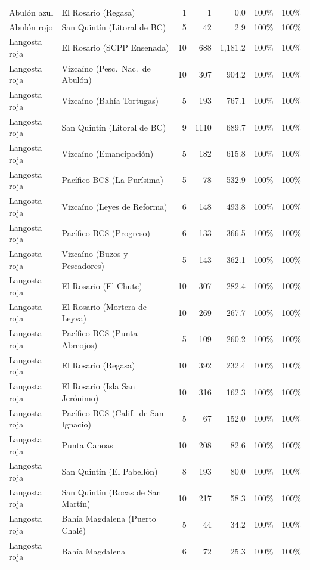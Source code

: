 \begin{longtable}{llrrrrc}
Abulón azul & El Rosario (Regasa) & 1 & 1 & 0.0 & 100\% & 100\% \\
Abulón rojo & San Quintín (Litoral de BC) & 5 & 42 & 2.9 & 100\% & 100\% \\
Langosta roja & El Rosario (SCPP Ensenada) & 10 & 688 & 1,181.2 & 100\% & 100\% \\
Langosta roja & Vizcaíno (Pesc.\ Nac.\ de Abulón) & 10 & 307 & 904.2 & 100\% & 100\% \\
Langosta roja & Vizcaíno (Bahía Tortugas) & 5 & 193 & 767.1 & 100\% & 100\% \\
Langosta roja & San Quintín (Litoral de BC) & 9 & 1110 & 689.7 & 100\% & 100\% \\
Langosta roja & Vizcaíno (Emancipación) & 5 & 182 & 615.8 & 100\% & 100\% \\
Langosta roja & Pacífico BCS (La Purísima) & 5 & 78 & 532.9 & 100\% & 100\% \\
Langosta roja & Vizcaíno (Leyes de Reforma) & 6 & 148 & 493.8 & 100\% & 100\% \\
Langosta roja & Pacífico BCS (Progreso) & 6 & 133 & 366.5 & 100\% & 100\% \\
Langosta roja & Vizcaíno (Buzos y Pescadores) & 5 & 143 & 362.1 & 100\% & 100\% \\
Langosta roja & El Rosario (El Chute) & 10 & 307 & 282.4 & 100\% & 100\% \\
Langosta roja & El Rosario (Mortera de Leyva) & 10 & 269 & 267.7 & 100\% & 100\% \\
Langosta roja & Pacífico BCS (Punta Abreojos) & 5 & 109 & 260.2 & 100\% & 100\% \\
Langosta roja & El Rosario (Regasa) & 10 & 392 & 232.4 & 100\% & 100\% \\
Langosta roja & El Rosario (Isla San Jerónimo) & 10 & 316 & 162.3 & 100\% & 100\% \\
Langosta roja & Pacífico BCS (Calif.\ de San Ignacio) & 5 & 67 & 152.0 & 100\% & 100\% \\
Langosta roja & Punta Canoas & 10 & 208 & 82.6 & 100\% & 100\% \\
Langosta roja & San Quintín (El Pabellón) & 8 & 193 & 80.0 & 100\% & 100\% \\
Langosta roja & San Quintín (Rocas de San Martín) & 10 & 217 & 58.3 & 100\% & 100\% \\
Langosta roja & Bahía Magdalena (Puerto Chalé) & 5 & 44 & 34.2 & 100\% & 100\% \\
Langosta roja & Bahía Magdalena & 6 & 72 & 25.3 & 100\% & 100\% \\

\end{longtable}
